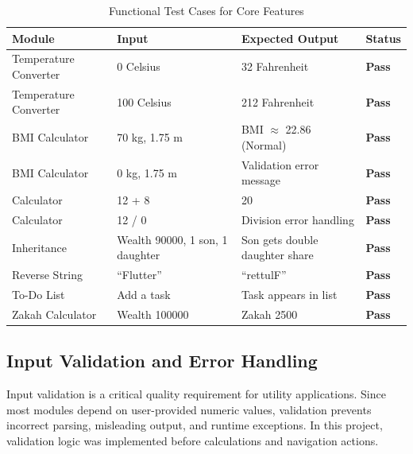 \documentclass{article}
\begin{document}
\begin{table}[H]
\centering
\caption{Functional Test Cases for Core Features}


\begin{tabular}{p{3.2cm} p{4.2cm} p{4.2cm} >{\centering\arraybackslash}p{2.5cm}}
\toprule
\rowcolor{gray!30}
\textbf{Module} & \textbf{Input} & \textbf{Expected Output} & \textbf{Status} \\
\midrule

Temperature Converter & 0 Celsius & 32 Fahrenheit & \textcolor{green!60!black}{\textbf{Pass}} \\
Temperature Converter & 100 Celsius & 212 Fahrenheit & \textcolor{green!60!black}{\textbf{Pass}} \\

BMI Calculator & 70 kg, 1.75 m & BMI $\approx$ 22.86 (Normal) & \textcolor{green!60!black}{\textbf{Pass}} \\
BMI Calculator & 0 kg, 1.75 m & Validation error message & \textcolor{green!60!black}{\textbf{Pass}} \\

Calculator & 12 + 8 & 20 & \textcolor{green!60!black}{\textbf{Pass}} \\
Calculator & 12 / 0 & Division error handling & \textcolor{green!60!black}{\textbf{Pass}} \\

Inheritance & Wealth 90000, 1 son, 1 daughter & Son gets double daughter share & \textcolor{green!60!black}{\textbf{Pass}} \\

Reverse String & ``Flutter'' & ``rettulF'' & \textcolor{green!60!black}{\textbf{Pass}} \\

To-Do List & Add a task & Task appears in list & \textcolor{green!60!black}{\textbf{Pass}} \\

Zakah Calculator & Wealth 100000 & Zakah 2500 & \textcolor{green!60!black}{\textbf{Pass}} \\

\bottomrule
\end{tabular}
\end{table}

\subsection{Input Validation and Error Handling}
Input validation is a critical quality requirement for utility applications. Since most modules depend on user-provided numeric values, validation prevents incorrect parsing, misleading output, and runtime exceptions. In this project, validation logic was implemented before calculations and navigation actions.
\end{document}
